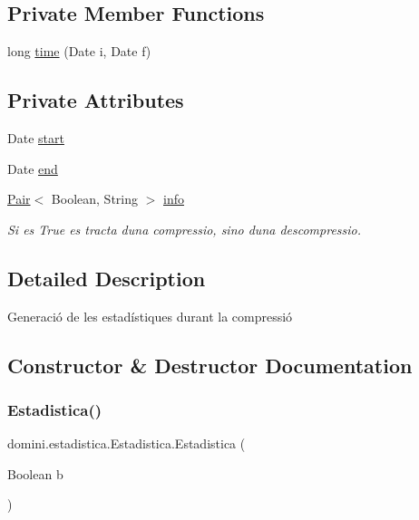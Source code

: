 \subsection*{Private Member Functions}
\begin{DoxyCompactItemize}
\item 
long \hyperlink{classdomini_1_1estadistica_1_1Estadistica_a7587e21e3f7f177afe0dd36483c8fe5d}{time} (Date i, Date f)
\end{DoxyCompactItemize}
\subsection*{Private Attributes}
\begin{DoxyCompactItemize}
\item 
Date \hyperlink{classdomini_1_1estadistica_1_1Estadistica_aee0ae604272563ceab4e61392cbd343e}{start}
\item 
Date \hyperlink{classdomini_1_1estadistica_1_1Estadistica_ae99e664f0569e308009ec7ca32864006}{end}
\item 
\hyperlink{classdomini_1_1utils_1_1Pair}{Pair}$<$ Boolean, String $>$ \hyperlink{classdomini_1_1estadistica_1_1Estadistica_a57776a71683b3717b638377073b8a99e}{info}
\begin{DoxyCompactList}\small\item\em Si es True es tracta d\textquotesingle{}una compressio, sino d\textquotesingle{}una descompressio. \end{DoxyCompactList}\end{DoxyCompactItemize}


\subsection{Detailed Description}
Generació de les estadístiques durant la compressió 

\subsection{Constructor \& Destructor Documentation}
\mbox{\label{classdomini_1_1estadistica_1_1Estadistica_aab5e956c9a7e31945ddf93cb4f332746}} 
\subsubsection{\texorpdfstring{Estadistica()}{Estadistica()}}
{\footnotesize\ttfamily domini.\+estadistica.\+Estadistica.\+Estadistica (\begin{DoxyParamCaption}\item[{Boolean}]{b }\end{DoxyParamCaption})\hspace{0.3cm}{\ttfamily [inline]}}




